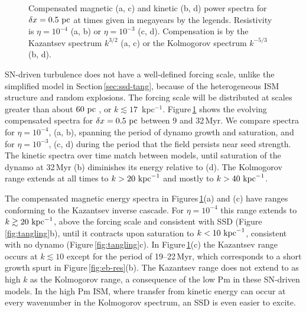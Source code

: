 \documentclass[preprint2]{aastex63}
\newcommand\kpc{~ {\rm kpc}}
\newcommand\pc{~ {\rm pc}}
\newcommand\dx{ {\delta x}}
\begin{document}
\begin{figure*}
\caption{
Compensated magnetic (a, c) and kinetic (b, d) power spectra for $\dx=0.5\pc$ at times given in megayears by
the legends.  Resistivity is 
 $\eta=10^{-4}$ (a, b) or $\eta=10^{-3}$ (c, d).
Compensation is by the Kazantsev spectrum 
$k^{3/2}$ (a, c) or the Kolmogorov spectrum $k^{-5/3}$ (b, d).
\label{fig:4power}}
\end{figure*}

 SN-driven turbulence does not have a well-defined forcing scale, unlike the
 simplified model in Section\,\ref{sec:ssd-tang}, because of the
 heterogeneous ISM structure and random explosions.
 The forcing scale will be distributed at scales greater than about $60\pc$
 \citep[][Table\,3]{HSSFG17}, or $k\lesssim17$~kpc$^{-1}$. 
 Figure\,\ref{fig:4power} shows the evolving compensated spectra for 
 $\dx=0.5\pc$ between 9 and 32\,Myr.
 We compare spectra for $\eta=10^{-4}$, (a, b), spanning the period of
 dynamo growth and saturation, and for $\eta=10^{-3}$, (c, d) during
 the period that the field
 persists near seed strength.
 The kinetic spectra over time match between models, until saturation
 of the dynamo at 32\,Myr (b) diminishes its energy relative to (d).
 The Kolmogorov range extends at all times to $k>20\kpc^{-1}$ and mostly 
 to $k>40\kpc^{-1}$. 

 The compensated magnetic energy spectra in Figures\,\ref{fig:4power}(a) and (c)
 have ranges conforming to the Kazantsev inverse cascade.
 For $\eta=10^{-4}$ this range extends to $k\gtrsim 20\kpc^{-1}$, above the
 forcing scale and consistent with SSD (Figure\,\ref{fig:tangling}b), until it
 contracts upon saturation to $k<10\kpc^{-1}$, consistent with no dynamo 
 (Figure\,\ref{fig:tangling}c).
 In Figure\,\ref{fig:4power}(c) the Kazantsev range occurs at $k\lesssim10$
 except for the period of 19--22\,Myr, which corresponds to a short growth
 spurt in Figure\,\ref{fig:eb-res}(b).
 The Kazantsev range does not extend to as high $k$ as the Kolmogorov range,
 a consequence of the low Pm in these SN-driven models. 
 In the high Pm ISM, where transfer from kinetic energy can occur at every
 wavenumber in the Kolmogorov spectrum, an SSD is even easier to excite.
\end{document}
